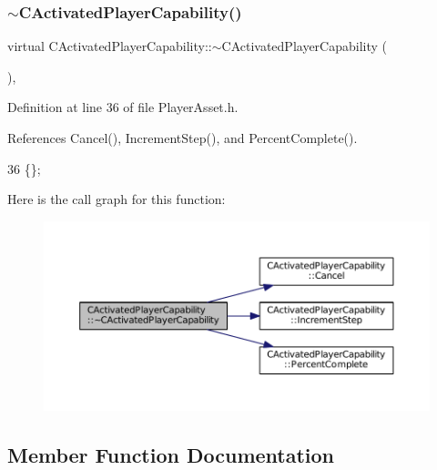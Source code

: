 \subsubsection{\texorpdfstring{$\sim$\+C\+Activated\+Player\+Capability()}{~CActivatedPlayerCapability()}}
{\footnotesize\ttfamily virtual C\+Activated\+Player\+Capability\+::$\sim$\+C\+Activated\+Player\+Capability (\begin{DoxyParamCaption}{ }\end{DoxyParamCaption})\hspace{0.3cm}{\ttfamily [inline]}, {\ttfamily [virtual]}}



Definition at line 36 of file Player\+Asset.\+h.



References Cancel(), Increment\+Step(), and Percent\+Complete().


\begin{DoxyCode}
36 \{\};
\end{DoxyCode}
Here is the call graph for this function\+:\nopagebreak
\begin{figure}[H]
\begin{center}
\leavevmode
\includegraphics[width=350pt]{classCActivatedPlayerCapability_a75845fda9554fb75644aae5a6c5f0084_cgraph}
\end{center}
\end{figure}


\subsection{Member Function Documentation}
\hypertarget{classCActivatedPlayerCapability_a5cde83be468e262ad054d81e28684a81}{}\label{classCActivatedPlayerCapability_a5cde83be468e262ad054d81e28684a81} 
